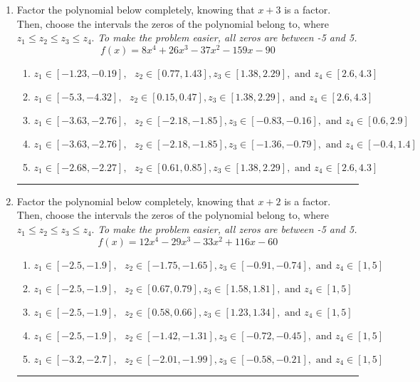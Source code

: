 \documentclass[14pt]{extbook}
\newcommand{\litem}[1]{\item#1\hspace*{-1cm}\rule{\textwidth}{0.4pt}}
\begin{document}
\begin{enumerate}
{\begin{enumerate}[label=\Alph*.]
\end{enumerate} }
\litem{
Factor the polynomial below completely, knowing that $x + 3$ is a factor. Then, choose the intervals the zeros of the polynomial belong to, where $z_1 \leq z_2 \leq z_3 \leq z_4$. \textit{To make the problem easier, all zeros are between -5 and 5.}\[ f(x) = 8x^{4} +26 x^{3} -37 x^{2} -159 x -90 \]\begin{enumerate}[label=\Alph*.]
\item \( z_1 \in [-1.23, -0.19], \text{   }  z_2 \in [0.77, 1.43], z_3 \in [1.38, 2.29], \text{   and   } z_4 \in [2.6, 4.3] \)
\item \( z_1 \in [-5.3, -4.32], \text{   }  z_2 \in [0.15, 0.47], z_3 \in [1.38, 2.29], \text{   and   } z_4 \in [2.6, 4.3] \)
\item \( z_1 \in [-3.63, -2.76], \text{   }  z_2 \in [-2.18, -1.85], z_3 \in [-0.83, -0.16], \text{   and   } z_4 \in [0.6, 2.9] \)
\item \( z_1 \in [-3.63, -2.76], \text{   }  z_2 \in [-2.18, -1.85], z_3 \in [-1.36, -0.79], \text{   and   } z_4 \in [-0.4, 1.4] \)
\item \( z_1 \in [-2.68, -2.27], \text{   }  z_2 \in [0.61, 0.85], z_3 \in [1.38, 2.29], \text{   and   } z_4 \in [2.6, 4.3] \)

\end{enumerate} }
\litem{
Factor the polynomial below completely, knowing that $x + 2$ is a factor. Then, choose the intervals the zeros of the polynomial belong to, where $z_1 \leq z_2 \leq z_3 \leq z_4$. \textit{To make the problem easier, all zeros are between -5 and 5.}\[ f(x) = 12x^{4} -29 x^{3} -33 x^{2} +116 x -60 \]\begin{enumerate}[label=\Alph*.]
\item \( z_1 \in [-2.5, -1.9], \text{   }  z_2 \in [-1.75, -1.65], z_3 \in [-0.91, -0.74], \text{   and   } z_4 \in [1, 5] \)
\item \( z_1 \in [-2.5, -1.9], \text{   }  z_2 \in [0.67, 0.79], z_3 \in [1.58, 1.81], \text{   and   } z_4 \in [1, 5] \)
\item \( z_1 \in [-2.5, -1.9], \text{   }  z_2 \in [0.58, 0.66], z_3 \in [1.23, 1.34], \text{   and   } z_4 \in [1, 5] \)
\item \( z_1 \in [-2.5, -1.9], \text{   }  z_2 \in [-1.42, -1.31], z_3 \in [-0.72, -0.45], \text{   and   } z_4 \in [1, 5] \)
\item \( z_1 \in [-3.2, -2.7], \text{   }  z_2 \in [-2.01, -1.99], z_3 \in [-0.58, -0.21], \text{   and   } z_4 \in [1, 5] \)


\end{enumerate}}
\end{enumerate}
\end{document}
